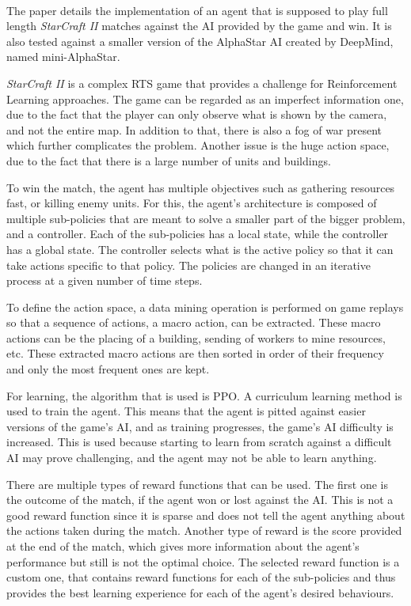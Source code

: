 \paragraph{}
The paper \cite{liu2022efficientstarcraft2} details the implementation of an agent that is supposed to play full length \emph{StarCraft II} matches against the AI provided by the game and win. It is also tested against a smaller version of the AlphaStar AI created by DeepMind, named mini-AlphaStar.

\emph{StarCraft II} is a complex RTS game that provides a challenge for Reinforcement Learning approaches. The game can be regarded as an imperfect information one, due to the fact that the player can only observe what is shown by the camera, and not the entire map. In addition to that, there is also a fog of war present which further complicates the problem. Another issue is the huge action space, due to the fact that there is a large number of units and buildings.

To win the match, the agent has multiple objectives such as gathering resources fast, or killing enemy units. For this, the agent's architecture is composed of multiple sub-policies that are meant to solve a smaller part of the bigger problem, and a controller. Each of the sub-policies has a local state, while the controller has a global state. The controller selects what is the active policy so that it can take actions specific to that policy. The policies are changed in an iterative process at a given number of time steps.

To define the action space, a data mining operation is performed on game replays so that a sequence of actions, a macro action, can be extracted. These macro actions can be the placing of a building, sending of workers to mine resources, etc. These extracted macro actions are then sorted in order of their frequency and only the most frequent ones are kept.

For learning, the algorithm that is used is PPO. A curriculum learning method is used to train the agent. This means that the agent is pitted against easier versions of the game's AI, and as training progresses, the game's AI difficulty is increased. This is used because starting to learn from scratch against a difficult AI may prove challenging, and the agent may not be able to learn anything.

There are multiple types of reward functions that can be used. The first one is the outcome of the match, if the agent won or lost against the AI. This is not a good reward function since it is sparse and does not tell the agent anything about the actions taken during the match. Another type of reward is the score provided at the end of the match, which gives more information about the agent's performance but still is not the optimal choice. The selected reward function is a custom one, that contains reward functions for each of the sub-policies and thus provides the best learning experience for each of the agent's desired behaviours.

